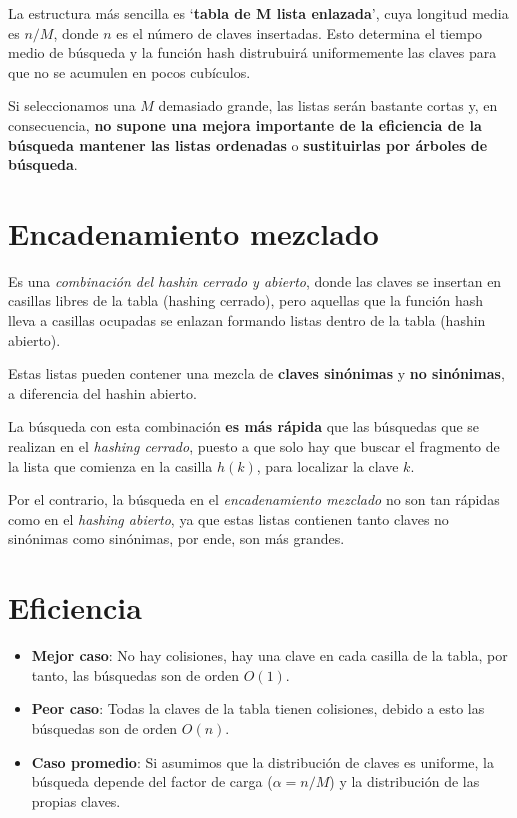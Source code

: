 La estructura más sencilla es `\textbf{tabla de M lista enlazada}', cuya longitud media es \(n/M\), donde \(n\) es el número de claves insertadas. Esto determina el tiempo medio de búsqueda y la función hash distrubuirá uniformemente las claves para que no se acumulen en pocos cubículos.

Si seleccionamos una \(M\) demasiado grande, las listas serán bastante cortas y, en consecuencia, \textbf{no supone una mejora importante de la eficiencia de la búsqueda mantener las listas ordenadas} o \textbf{sustituirlas por árboles de búsqueda}.

\section{Encadenamiento mezclado}
Es una \textit{combinación del hashin cerrado y abierto}, donde las claves se insertan en casillas libres de la tabla (hashing cerrado), pero aquellas que la función hash lleva a casillas ocupadas se enlazan formando listas dentro de la tabla (hashin abierto).

Estas listas pueden contener una mezcla de \textbf{claves sinónimas} y \textbf{no sinónimas}, a diferencia del hashin abierto.

La búsqueda con esta combinación \textbf{es más rápida} que las búsquedas que se realizan en el \textit{hashing cerrado}, puesto a que solo hay que buscar el fragmento de la lista que comienza en la casilla \(h(k)\), para localizar la clave \(k\).

Por el contrario, la búsqueda en el \textit{encadenamiento mezclado} no son tan rápidas como en el \textit{hashing abierto}, ya que estas listas contienen tanto claves no sinónimas como sinónimas, por ende, son más grandes.
\section{Eficiencia}
\begin{itemize}
  \item \textbf{Mejor caso}: No hay colisiones, hay una clave en cada casilla de la tabla, por tanto, las búsquedas son de orden \(O(1)\).
  \item \textbf{Peor caso}: Todas la claves de la tabla tienen colisiones, debido a esto las búsquedas son de orden \(O(n)\).
  \item \textbf{Caso promedio}: Si asumimos que la distribución de claves es uniforme, la búsqueda depende del factor de carga (\(\alpha = n/M\)) y la distribución de las propias claves.
\end{itemize}

